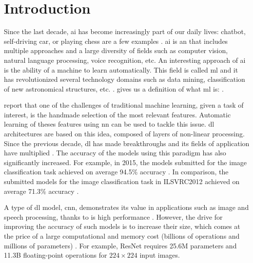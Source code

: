 \chapter*{Introduction} \label{chap:intr}
%
%
Since the last decade, \acrfull{ai} has become increasingly part of our daily lives: chatbot, self-driving car, or playing chess are a few examples \cite{russell_artificial_2009}. \acrshort{ai} is an  that includes multiple approaches and a large diversity of fields such as computer vision, natural language processing, voice recognition, etc. An interesting approach of \acrshort{ai} is the ability of a machine to learn automatically. This field is called \acrfull{ml} and it has revolutionized several technology domains such as data mining, classification of new astronomical structures, etc. \cite{alom_history_2018, mitchell_machine_1997}. \textcite{mitchell_machine_1997} gives us a definition of what \acrshort{ml} is: .

\textcite{arnold_introduction_2011} report that one of the challenges of traditional machine learning, given a task of interest, is the handmade selection of the most relevant features. Automatic learning of theses features using \acrfull{nn} can be used to tackle this issue. \acrfull{dl} architectures are based on this idea, composed of layers of non-linear processing. Since the previous decade, \acrshort{dl} has made breakthroughs and its fields of application have multiplied \cite{wason_deep_2018}. The accuracy of the models using this paradigm has also significantly increased. For example, in 2015, the models submitted for the image classification task achieved on average 94.5\% accuracy \cite{russakovsky_imagenet_2015}. In comparison, the submitted models for the image classification task in ILSVRC2012 achieved on average 71.3\% accuracy \cite{noauthor_imagenet_nodate}.

A type of \acrshort{dl} model, \acrfull{cnn}, demonstrates its value in applications such as image and speech processing, thanks to is high performance \cite{shawahna_fpga-based_2019}. However, the drive for improving the accuracy of such models is to increase their size, which comes at the price of a large computational and memory cost (billions of operations and millions of parameters) \cite{szegedy_going_2015, khan_survey_2020}. For example, ResNet \cite{he_deep_2016} requires 25.6M parameters and 11.3B floating-point operations for $224 \times 224$ input images.

